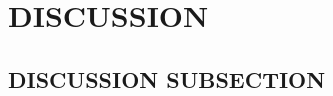 \documentclass[../main/main.tex]{subfiles}
\begin{document}
\section{DISCUSSION}

\subsection{DISCUSSION SUBSECTION}
\end{document}
